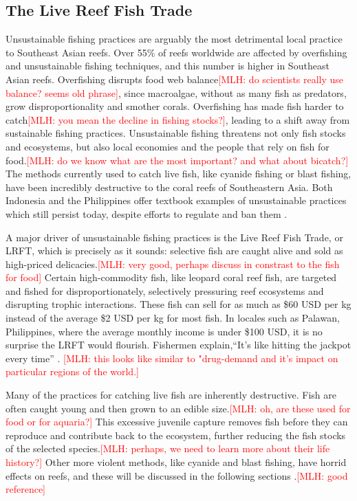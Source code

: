 \documentclass{book}\usepackage{knitr}
\newcommand{\red}[1]{\textcolor{red}{[MLH: #1]}}
\begin{document}
{\subsection{The Live Reef Fish Trade}

Unsustainable fishing practices are arguably the most detrimental local practice to Southeast Asian reefs. Over 55\% of reefs worldwide are affected by overfishing and unsustainable fishing techniques, and this number is higher in Southeast Asian reefs. Overfishing disrupts food web balance\red{do scientists really use balance? seems old phrase}, since macroalgae, without as many fish as predators, grow disproportionality and smother corals. Overfishing has made fish harder to catch\red{you mean the decline in fishing stocks?}, leading to a shift away from sustainable fishing practices. Unsustainable fishing threatens not only fish stocks and ecosystems, but also local economies and the people that rely on fish for food.\red{do we know what are the most important?  and what about bicatch?} The methods currently used to catch live fish, like cyanide fishing or blast fishing, have been incredibly destructive to the coral reefs of Southeastern Asia. Both Indonesia and the Philippines offer textbook examples of unsustainable practices which still persist today, despite efforts to regulate and ban them \citep{coralreefalliance_2021}.

A major driver of unsustainable fishing practices is the Live Reef Fish Trade, or LRFT, which is precisely as it sounds: selective fish are caught alive and sold as high-priced delicacies.\red{very good, perhaps discuss in constrast to the fish for food} Certain high-commodity fish, like leopard coral reef fish, are targeted and fished for disproportionately, selectively pressuring reef ecosystems and disrupting trophic interactions. These fish can sell for as much as \$60 USD per kg instead of the average \$2 USD per kg for most fish. In locales such as Palawan, Philippines, where the average monthly income is under \$100 USD, it is no surprise the LRFT would flourish. Fishermen explain,``It's like hitting the jackpot every time'' \citep{10.2307/40603032}. \red{this looks like similar to "drug-demand and it's impact on particular regions of the world.}

Many of the practices for catching live fish are inherently destructive. Fish are often caught young and then grown to an edible size.\red{oh, are these used for food or for aquaria?} This excessive juvenile capture removes fish before they can reproduce and contribute back to the ecosystem, further reducing the fish stocks of the selected species.\red{perhaps, we need to learn more about their life history?} Other more violent methods, like cyanide and blast fishing, have horrid effects on reefs, and these will be discussed in the following sections \citep{10.2307/40603032}.\red{good reference}  

}
\end{document}
